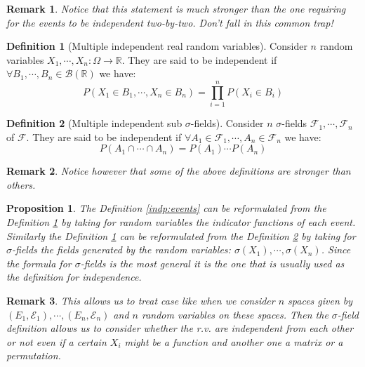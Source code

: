 \documentclass[10pt,a4paper]{book}
\newtheorem{proposition}{Proposition}[section]
\newtheorem*{remark}{Remark}
\theoremstyle{definition}
\newtheorem{definition}{Definition}[section]
\begin{document}
\begin{remark}
Notice that this statement is much stronger than the one requiring for the events to be independent two-by-two. Don't fall in this common trap!
\end{remark}

\begin{definition}[Multiple independent real random variables] \label{indp:rv} Consider $n$ random variables $X_1, \cdots, X_n : \Omega \to \mathbb{R}$. They are said to be independent if $\forall B_1, \cdots, B_n \in \mathcal{B}(\mathbb{R})$ we have:
\[
P(X_1 \in B_1, \cdots, X_n \in B_n) = \prod_{i = 1}^n P(X_i \in B_i)
\]
\end{definition}

\begin{definition}[Multiple independent sub $\sigma$-fields] \label{indp:sigma} Consider $n$ $\sigma$-fields $\mathcal{F}_1, \cdots, \mathcal{F}_n$ of $\mathcal{F}$. They are said to be independent if $\forall A_1 \in \mathcal{F}_1, \cdots, A_n \in \mathcal{F}_n$ we have:
\[
P(A_1 \cap \cdots \cap A_n) = P(A_1) \cdots P(A_n)
\]
\end{definition}

\begin{remark}
Notice however that some of the above definitions are stronger than others.
\end{remark}

\begin{proposition}

The Definition \ref{indp:events} can be reformulated from the Definition \ref{indp:rv} by taking for random variables the indicator functions of each event. Similarly the Definition \ref{indp:rv} can be reformulated from the Definition \ref{indp:sigma} by taking for $\sigma$-fields the fields generated by the random variables: $\sigma(X_1), \cdots, \sigma(X_n)$. Since the formula for $\sigma$-fields is the most general it is the one that is usually used as the definition for independence. 

\end{proposition}

\begin{remark}

This allows us to treat case like when we consider $n$ spaces given by $(E_1, \mathcal{E}_1), \cdots, (E_n, \mathcal{E}_n)$ and $n$ random variables on these spaces. Then the $\sigma$-field definition allows us to consider whether the r.v. are independent from each other or not even if a certain $X_i$ might be a function and another one a matrix or a permutation.  

\end{remark}
\end{document}
